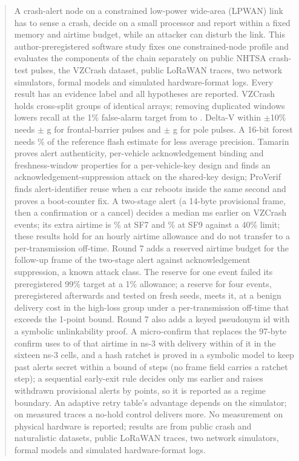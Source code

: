 \documentclass{ieeeaccess}
\begin{document}
\begin{abstract}
A crash-alert node on a constrained low-power wide-area (LPWAN) link has to sense a crash, decide on a small processor and report within a fixed memory and airtime budget, while an attacker can disturb the link. This author-preregistered software study fixes one constrained-node profile and evaluates the components of the chain separately on \SevTests{} public NHTSA crash-test pulses, the VZCrash dataset, public LoRaWAN traces, two network simulators, formal models and simulated hardware-format logs. Every result has an evidence label and all hypotheses are reported. VZCrash holds \VzGroups{} cross-split groups of identical arrays; removing duplicated windows lowers recall at the 1\% false-alarm target from \VzROneSup{} to \VzROneNear{}. Delta-V within $\pm$10\% needs $\pm$\ModeFrontReal{} g for frontal-barrier pulses and $\pm$\ModePoleReal{} g for pole pulses. A 16-bit forest needs \PfourRatio\% of the reference flash estimate for \PfourApLoss{} less average precision. Tamarin proves alert authenticity, per-vehicle acknowledgement binding and freshness-window properties for a per-vehicle-key design and finds an acknowledgement-suppression attack on the shared-key design; ProVerif finds alert-identifier reuse when a car reboots inside the same second and proves a boot-counter fix. A two-stage alert (a 14-byte provisional frame, then a confirmation or a cancel) decides a median \TThreeEarlier{} ms earlier on VZCrash events; its extra airtime is \NsAirHiSfSeven\% at SF7 and \NsAirHiSfNine\% at SF9 against a 40\% limit; these results hold for an hourly airtime allowance and do not transfer to a per-transmission off-time. Round 7 adds a reserved airtime budget for the follow-up frame of the two-stage alert against acknowledgement suppression, a known attack class. The reserve for one event failed its preregistered 99\% target at a 1\% allowance; a reserve for four events, preregistered afterwards and tested on fresh seeds, meets it, at a benign delivery cost in the high-loss group under a per-transmission off-time that exceeds the 1-point bound. Round 7 also adds a keyed pseudonym id with a symbolic unlinkability proof. A micro-confirm that replaces the 97-byte confirm uses \RSixAirOverRThreeLo{} to \RSixAirOverRThreeHi{} of that airtime in ns-3 with delivery within \RSixDeliveryGapMax{} of it in the sixteen ns-3 cells, and a hash ratchet is proved in a symbolic model to keep past alerts secret within a bound of \RSixRatchetSteps{} steps (no frame field carries a ratchet step); a sequential early-exit rule decides only \RSixSeqGain{} ms earlier and raises withdrawn provisional alerts by \RSixSeqRetractRise{} points, so it is reported as a regime boundary. An adaptive retry table's advantage depends on the simulator; on measured traces a no-hold control delivers more. No measurement on physical hardware is reported; results are from public crash and naturalistic datasets, public LoRaWAN traces, two network simulators, formal models and simulated hardware-format logs.
\end{abstract}
\end{document}
